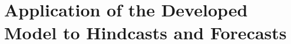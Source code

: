 %
\section{Application of the Developed Model to Hindcasts and Forecasts}
\label{sec:6_Application}


%
